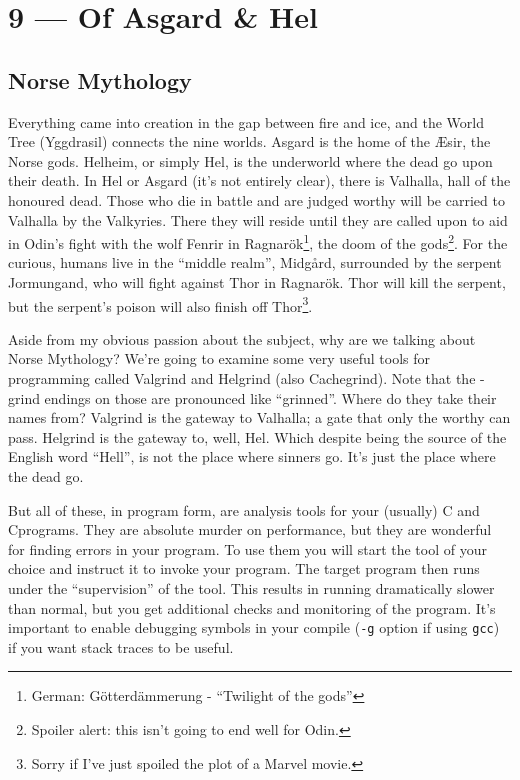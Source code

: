 \documentclass[a4paper]{report}
\newcommand{\CPP}{C\nolinebreak\hspace{-.05em}\raisebox{.4ex}{\tiny\bf +}\nolinebreak\hspace{-.10em}\raisebox{.4ex}{\tiny\bf +}}
\def\CPP{{C\nolinebreak[4]\hspace{-.05em}\raisebox{.4ex}{\tiny\bf ++}}}
\begin{document}
\chapter*{9 --- Of Asgard \& Hel}


\section*{Norse Mythology}
Everything came into creation in the gap between fire and ice, and the World Tree (Yggdrasil) connects the nine worlds. Asgard is the home of the \AE sir, the Norse gods. Helheim, or simply Hel, is the underworld where the dead go upon their death. In Hel or Asgard (it's not entirely clear), there is Valhalla, hall of the honoured dead. Those who die in battle and are judged worthy will be carried to Valhalla by the Valkyries. There they will reside until they are called upon to aid in Odin's fight with the wolf Fenrir in Ragnar\"ok\footnote{German: G\"otterd\"ammerung - ``Twilight of the gods''}, the doom of the gods\footnote{Spoiler alert: this isn't going to end well for Odin.}. For the curious, humans live in the ``middle realm'', Midg\aa rd, surrounded by the serpent Jormungand, who will fight against Thor in  Ragnar\"ok. Thor will kill the serpent, but the serpent's poison will also finish off Thor\footnote{Sorry if I've just spoiled the plot of a Marvel movie.}.

Aside from my obvious passion about the subject, why are we talking about Norse Mythology? We're going to examine some very useful tools for programming called Valgrind and Helgrind (also Cachegrind). Note that the -grind endings on those are pronounced like ``grinned''. Where do they take their names from? Valgrind is the gateway to Valhalla; a gate that only the worthy can pass. Helgrind is the gateway to, well, Hel. Which despite being the source of the English word ``Hell'', is not the place where sinners go. It's just the place where the dead go.

But all of these, in program form, are analysis tools for your (usually) C and \CPP programs. They are absolute murder on performance, but they are wonderful for finding errors in your program. To use them you will start the tool of your choice and instruct it to invoke your program. The target program then runs under the ``supervision'' of the tool. This results in running dramatically slower than normal, but you get additional checks and monitoring of the program. It's important to enable debugging symbols in your compile (\texttt{-g} option if using \texttt{gcc}) if you want stack traces to be useful.
\end{document}
